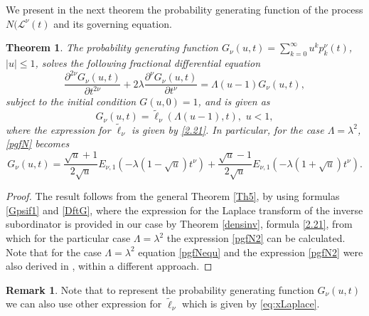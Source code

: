 \documentclass[12pt]{article}
\theoremstyle{definition}
\newtheorem{remark}{Remark}
\theoremstyle{plain}
\newtheorem{theorem}{Theorem}
\begin{document}
\bigskip


We present in the next theorem the probability generating function of the process $N(\mathcal{L}^\nu(t)$ and its governing equation.

\begin{theorem}\label{thpgfN}
	The probability generating function $%
	{G}_\nu(u, t) = \sum_{k=0}^{\infty} u^k {p}_k^\nu(t)$, $|u| \leq 1$, solves the following fractional differential equation
	\begin{equation}\label{pgfNequ}
		\frac{\partial^{2\nu} G_\nu(u, t)}{\partial t^{2\nu}} + 2\lambda \frac{\partial^\nu G_\nu(u, t)}{\partial t^\nu} = \Lambda(u - 1)G_\nu(u, t), 
	\end{equation}
	subject to the initial condition $G(u, 0) = 1$, and is given as
	\begin{equation}\label{pgfN}
		G_\nu(u, t) = \tilde \ell_\nu (\Lambda(u - 1), t), \,\,u < 1,
	\end{equation}
	where the expression for $\tilde \ell_\nu$ is given by \eqref{2.21}.
	In particular, for the case $\Lambda=\lambda^2$, \eqref{pgfN} becomes
	\begin{equation}\label{pgfN2}
		{G}_\nu(u, t) = \frac{\sqrt{u} + 1}{2\sqrt{u}} E_{\nu, 1}(-\lambda(1 - \sqrt{u})t^\nu) + \frac{\sqrt{u} - 1}{2\sqrt{u}} E_{\nu, 1}(-\lambda(1 + \sqrt{u})t^\nu).
	\end{equation}
\end{theorem}

\begin{proof}
The result follows from the general Theorem \ref{Th5}, by using formulas \eqref{Gpsif1} and \eqref{DftG}, where the expression for the Laplace transform of the inverse subordinator is provided in our case by Theorem \ref{densinv}, formula \eqref{2.21}, from which for the particular case $\Lambda=\lambda^2$ the  expression \eqref{pgfN2}	 can be calculated. 
Note that for the  case  $\Lambda=\lambda^2$ equation \eqref{pgfNequ} and the expression \eqref{pgfN2} were also derived in \cite{BO2010}, within a different approach. 
\end{proof}

\begin{remark}
Note that to represent the probability generating function $G_\nu(u, t)$ we can also use other expression for $\tilde \ell_\nu$ which is  given by \eqref{eq:xLaplace}. 
\end{remark}
\end{document}
